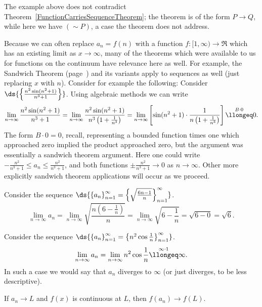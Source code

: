 The example above
 does not contradict Theorem~\ref{FunctionCarriesSequenceTheorem};
the theorem is of the form $P\longrightarrow Q$, while here we have
$(\sim P)$, a case the theorem does not address. 





Because we can often replace $a_n=f(n)$ with a function
$f:[1,\infty)\longrightarrow\Re$ which has an existing limit
as $x\to\infty$, many of the theorems 
which were available to us for functions on the continuum
have relevance here as well.  For example, the Sandwich Theorem
(page~\pageref{SandwichTheoremStatement}) and its variants
apply to sequences as well (just replacing $x$ with $n$).  
Consider for example the following:
\bex Consider $\ds{\left\{\frac{n^2\sin (n^2+1)}{n^3+1}\right\}}$.
     Using algebraic methods we can write
     $$\lim_{n\to\infty}\frac{n^2\sin (n^2+1)}{n^3+1}
             =\lim_{n\to\infty}\frac{n^2\sin (n^2+1)}
                   {n^3\left(1+\frac1{n^3}\right)}
             =\lim_{n\to\infty}
                 \left[\sin(n^2+1)\cdot\frac1{n\left(1+\frac1{n^3}\right)}
                            \right]
             \overset{B\cdot0}\llongeq0.$$
\eex
The form $B\cdot0=0$, recall, representing a bounded function
times one which approached zero implied the product approached zero,
but the argument was essentially a sandwich theorem argument.
Here one could write $-\frac{n^2}{n^3+1}\le a_n\le \frac{n^2}{n^3+1}$,
and both functions $\pm\frac{n^2}{n^3+1}\longrightarrow0$ as $n\to\infty$.
Other more explicitly sandwich theorem applications will occur
as we proceed.

\bex Consider the sequence $\ds{\left\{a_n\right\}_{n=1}^\infty=
            \left\{\sqrt{\frac{6n-1}{n}}\right\}_{n=1}^\infty}$.
\label{SequenceW/Sqrt(6n-1)/(n)}
$$\lim_{n\to\infty}a_n=
\lim_{n\to\infty}\sqrt{\frac{n\left(6-\frac1n\right)}{n}}
=\lim_{n\to\infty}\sqrt{6-\frac1n}=\sqrt{6-0}=\sqrt6.$$
\eex

\bex  Consider the sequence $\ds{\left\{a_n\right\}_{n=1}^\infty
=\left\{n^2\cos\frac1n\right\}_{n=1}^\infty}$.
$$\lim_{n\to\infty}a_n=\lim_{n\to\infty}n^2\cos\frac1n
\overset{\infty\cdot1}{\llongeq}\infty.$$
In such a case we would say that $a_n$ diverges to $\infty$ (or
just diverges, to be less descriptive).\eex
\begin{theorem}
If $a_n\longrightarrow L$ and 
$f(x)$ is continuous at $L$, then $f(a_n)\longrightarrow f(L)$.
\label{ContFunctCarriesSequenceToF(Limit)}
\end{theorem}

